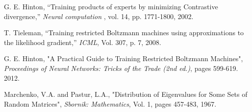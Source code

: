 \begin{thebibliography}{9}

G. E. Hinton, “Training products of experts by minimizing Contrastive divergence,”
\textit{Neural computation}
, vol. 14, pp. 1771-1800, 2002.

T. Tieleman, “Training restricted Boltzmann machines using approximations to the likelihood gradient,”
\textit{ICML}, Vol. 307, p. 7, 2008.

G. E. Hinton, "A Practical Guide to Training Restricted Boltzmann Machines", \textit{Proceedings of Neural Networks: Tricks of the Trade (2nd ed.)}, pages 599-619. 2012. 

Marchenko, V.A. and Pastur, L.A., "Distribution of Eigenvalues for Some Sets of Random Matrices", \textit{Sbornik: Mathematics}, Vol. 1, pages 457-483, 1967.

\end{thebibliography}
